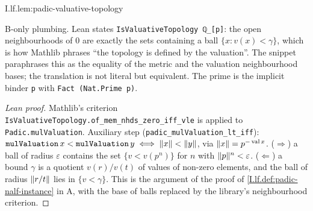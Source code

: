 \begin{lemma}
\bonly
{}
\end{lemma}
\begin{tfformal}{I.lf.lem:padic-valuative-topology}
\begin{tffidelity}
B-only plumbing. Lean states \texttt{IsValuativeTopology ℚ\_[p]}: the open neighbourhoods of $0$ are exactly the sets containing a ball $\{x:v(x)<\gamma\}$, which is how Mathlib phrases ``the topology is defined by the valuation''. The snippet paraphrases this as the equality of the metric and the valuation neighbourhood bases; the translation is not literal but equivalent. The prime is the implicit binder \texttt{p} with \texttt{Fact (Nat.Prime p)}.
\end{tffidelity}
\end{tfformal}
\begin{proof}[Lean proof]
Mathlib's criterion \texttt{IsValuativeTopology.of\_mem\_nhds\_zero\_iff\_vle} is applied to \texttt{Padic.mulValuation}. Auxiliary step (\texttt{padic\_mulValuation\_lt\_iff}): $\texttt{mulValuation}\,x<\texttt{mulValuation}\,y\iff\lVert x\rVert<\lVert y\rVert$, via $\lVert x\rVert=p^{-\operatorname{val}x}$. ($\Rightarrow$) a ball of radius $\varepsilon$ contains the set $\{v<v(p^n)\}$ for $n$ with $\lVert p\rVert^n<\varepsilon$. ($\Leftarrow$) a bound $\gamma$ is a quotient $v(r)/v(t)$ of values of non-zero elements, and the ball of radius $\lVert r/t\rVert$ lies in $\{v<\gamma\}$. This is the argument of the proof of \cref{I.lf.def:padic-nalf-instance} in A, with the base of balls replaced by the library's neighbourhood criterion.
\end{proof}

